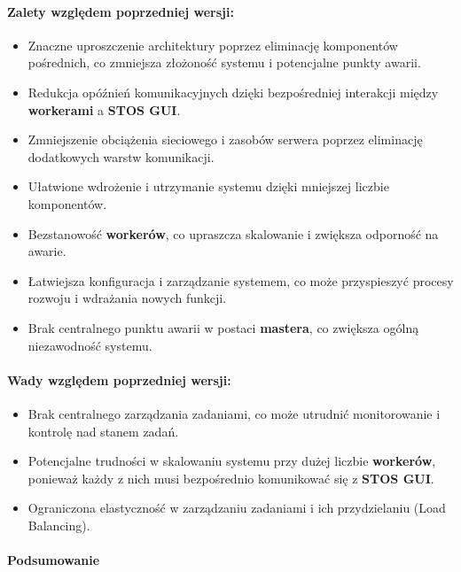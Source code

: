 \documentclass[12pt,a4paper]{article}
\begin{document}
\paragraph*{Zalety względem poprzedniej wersji:}
\begin{itemize}
    \item Znaczne uproszczenie architektury poprzez eliminację komponentów pośrednich, co zmniejsza złożoność systemu i potencjalne punkty awarii.
    \item Redukcja opóźnień komunikacyjnych dzięki bezpośredniej interakcji między \textbf{workerami} a \textbf{STOS GUI}.
    \item Zmniejszenie obciążenia sieciowego i zasobów serwera poprzez eliminację dodatkowych warstw komunikacji.
    \item Ułatwione wdrożenie i utrzymanie systemu dzięki mniejszej liczbie komponentów.
    \item Bezstanowość \textbf{workerów}, co upraszcza skalowanie i zwiększa odporność na awarie.
    \item Łatwiejsza konfiguracja i zarządzanie systemem, co może przyspieszyć procesy rozwoju i wdrażania nowych funkcji.
    \item Brak centralnego punktu awarii w postaci \textbf{mastera}, co zwiększa ogólną niezawodność systemu.
\end{itemize}
\paragraph*{Wady względem poprzedniej wersji:}
\begin{itemize}
    \item Brak centralnego zarządzania zadaniami, co może utrudnić monitorowanie i kontrolę nad stanem zadań.
    \item Potencjalne trudności w skalowaniu systemu przy dużej liczbie \textbf{workerów}, ponieważ każdy z nich musi bezpośrednio komunikować się z \textbf{STOS GUI}.
    \item Ograniczona elastyczność w zarządzaniu zadaniami i ich przydzielaniu (Load Balancing).
\end{itemize}

\paragraph*{Podsumowanie}\mbox{}
\end{document}
